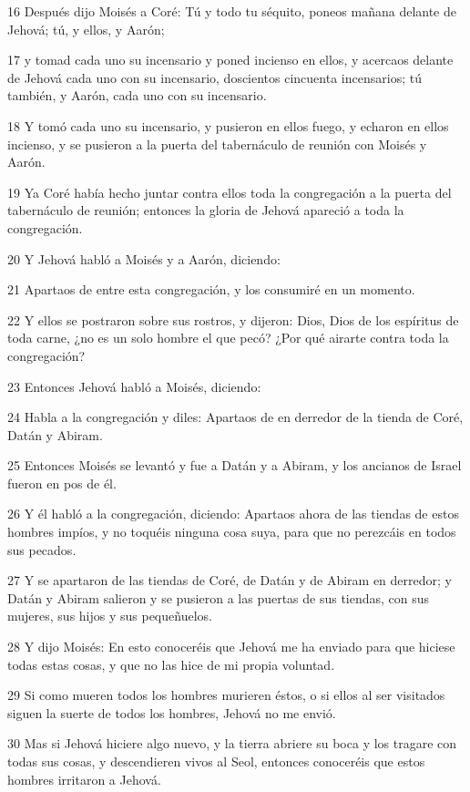 \par 16 Después dijo Moisés a Coré: Tú y todo tu séquito, poneos mañana delante de Jehová; tú, y ellos, y Aarón;
\par 17 y tomad cada uno su incensario y poned incienso en ellos, y acercaos delante de Jehová cada uno con su incensario, doscientos cincuenta incensarios; tú también, y Aarón, cada uno con su incensario.
\par 18 Y tomó cada uno su incensario, y pusieron en ellos fuego, y echaron en ellos incienso, y se pusieron a la puerta del tabernáculo de reunión con Moisés y Aarón.
\par 19 Ya Coré había hecho juntar contra ellos toda la congregación a la puerta del tabernáculo de reunión; entonces la gloria de Jehová apareció a toda la congregación.
\par 20 Y Jehová habló a Moisés y a Aarón, diciendo:
\par 21 Apartaos de entre esta congregación, y los consumiré en un momento.
\par 22 Y ellos se postraron sobre sus rostros, y dijeron: Dios, Dios de los espíritus de toda carne, ¿no es un solo hombre el que pecó? ¿Por qué airarte contra toda la congregación?
\par 23 Entonces Jehová habló a Moisés, diciendo:
\par 24 Habla a la congregación y diles: Apartaos de en derredor de la tienda de Coré, Datán y Abiram.
\par 25 Entonces Moisés se levantó y fue a Datán y a Abiram, y los ancianos de Israel fueron en pos de él.
\par 26 Y él habló a la congregación, diciendo: Apartaos ahora de las tiendas de estos hombres impíos, y no toquéis ninguna cosa suya, para que no perezcáis en todos sus pecados.
\par 27 Y se apartaron de las tiendas de Coré, de Datán y de Abiram en derredor; y Datán y Abiram salieron y se pusieron a las puertas de sus tiendas, con sus mujeres, sus hijos y sus pequeñuelos.
\par 28 Y dijo Moisés: En esto conoceréis que Jehová me ha enviado para que hiciese todas estas cosas, y que no las hice de mi propia voluntad.
\par 29 Si como mueren todos los hombres murieren éstos, o si ellos al ser visitados siguen la suerte de todos los hombres, Jehová no me envió.
\par 30 Mas si Jehová hiciere algo nuevo, y la tierra abriere su boca y los tragare con todas sus cosas, y descendieren vivos al Seol, entonces conoceréis que estos hombres irritaron a Jehová.
